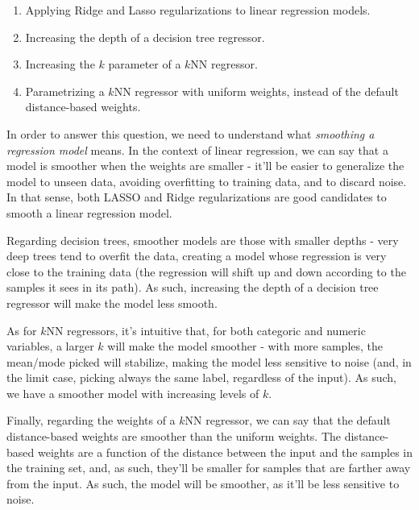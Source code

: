 \documentclass[12pt]{article}
\begin{document}
\begin{enumerate}[leftmargin=\labelsep]
{        \begin{enumerate}
          \item Applying Ridge and Lasso regularizations to linear regression models.
          \item Increasing the depth of a decision tree regressor.
          \item Increasing the $k$ parameter of a $k$NN regressor.
          \item Parametrizing a $k$NN regressor with uniform weights, instead of the default distance-based weights.
        \end{enumerate}
        }

        In order to answer this question, we need to understand what \textit{smoothing
          a regression model} means. In the context of linear regression, we can say that
        a model is smoother when the weights are smaller - it'll be easier
        to generalize the model to unseen data, avoiding overfitting to training data,
        and to discard noise. In that sense, both LASSO and Ridge regularizations
        are good candidates to smooth a linear regression model.

        Regarding decision trees, smoother models are those with smaller depths -
        very deep trees tend to overfit the data, creating a model whose regression
        is very close to the training data (the regression will shift up and down
        according to the samples it sees in its path). As such,
        increasing the depth of a decision tree regressor will make the model less
        smooth.

        As for $k$NN regressors, it's intuitive that, for both categoric and numeric
        variables, a larger $k$ will make the model smoother - with more samples,
        the mean/mode picked will stabilize, making the model less sensitive to
        noise (and, in the limit case, picking always the same label, regardless
        of the input). As such, we have a smoother model with increasing levels of $k$.

        Finally, regarding the weights of a $k$NN regressor, we can say that the
        default distance-based weights are smoother than the uniform weights. The
        distance-based weights are a function of the distance between the input
        and the samples in the training set, and, as such, they'll be smaller
        for samples that are farther away from the input. As such, the model
        will be smoother, as it'll be less sensitive to noise.
\end{enumerate}
\end{document}
